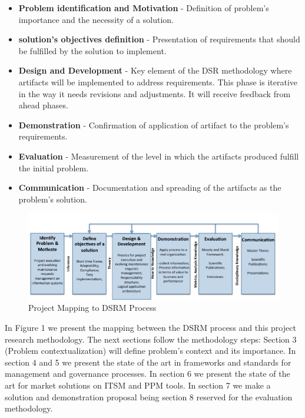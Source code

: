 \begin{itemize}
  \item \textbf{Problem identification and Motivation} - Definition of problem's importance and the necessity of a solution.
  \item \textbf{solution's objectives definition} - Presentation of requirements that should be fulfilled by the solution to implement. 
  \item \textbf{Design and Development} - Key element of the DSR methodology where artifacts will be implemented to address requirements. This phase is iterative in the way it needs revisions and adjustments. It will receive feedback from ahead phases.
  \item \textbf{Demonstration} -  Confirmation of application of artifact to the problem's requirements.
  \item \textbf{Evaluation} - Measurement of the level in which the artifacts produced fulfill the initial problem.
  \item \textbf{Communication} - Documentation and spreading of the artifacts as the problem's solution.
\end{itemize}

\begin{figure}[h!]
\centering
\includegraphics[width=\textwidth]{img/DSRMProcessMapping.png}
\caption{Project Mapping to DSRM Process}
\end{figure}


In Figure 1 we present the mapping between the DSRM process and this project research methodology. The next sections follow the methodology steps: Section 3 (Problem contextualization) will define problem's context and its importance. In section 4 and 5 we present the state of the art in frameworks and standards for management and governance processes. In section 6 we present the state of the art for market solutions on ITSM and PPM tools. In section 7 we make a solution and demonstration proposal being section 8 reserved for the evaluation methodology.\par


